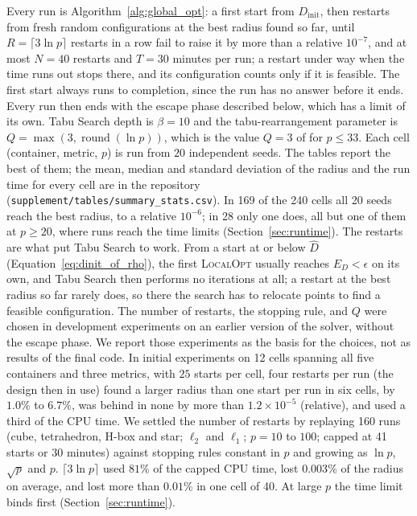 \documentclass[preprint,12pt]{elsarticle}
\theoremstyle{remark}
\begin{document}
Every run is Algorithm~\ref{alg:global_opt}: a first start from
$D_{\text{init}}$, then restarts from fresh random configurations at the best
radius found so far, until $R = \lceil 3 \ln p \rceil$ restarts in a row fail to
raise it by more than a relative $10^{-7}$, and at most $N = 40$ restarts and $T
= 30$ minutes per run; a restart under way when the time runs out stops there,
and its configuration counts only if it is feasible. The first start always runs
to completion, since the run has no answer before it ends. Every run then ends
with the escape phase described below, which has a limit of its own. Tabu Search
depth is $\beta = 10$ and the tabu-rearrangement parameter is $Q = \max(3,
\operatorname{round}(\ln p))$, which is the value $Q = 3$ of \citet{lai2024} for
$p \le 33$. Each cell (container, metric, $p$) is run from $20$ independent
seeds. The tables report the best of them; the mean, median and standard
deviation of the radius and the run time for every cell are in the repository
(\texttt{supplement/tables/summary\_stats.csv}). In 169 of the 240 cells all 20
seeds reach the best radius, to a relative $10^{-6}$; in 28 only one does, all
but one of them at $p \ge 20$, where runs reach the time limits
(Section~\ref{sec:runtime}). The restarts are what put Tabu Search to work. From
a start at or below $\hat D$ (Equation~\ref{eq:dinit_of_rho}), the first
\textsc{LocalOpt} usually reaches $E_D < \epsilon$ on its own, and Tabu Search
then performs no iterations at all; a restart at the best radius so far rarely
does, so there the search has to relocate points to find a feasible
configuration. The number of restarts, the stopping rule, and $Q$ were chosen in
development experiments on an earlier version of the solver, without the escape
phase. We report those experiments as the basis for the choices, not as results
of the final code. In initial experiments on 12 cells spanning all five
containers and three metrics, with $25$ starts per cell, four restarts per run
(the design then in use) found a larger radius than one start per run in six
cells, by $1.0\%$ to $6.7\%$, was behind in none by more than $1.2 \times
10^{-5}$ (relative), and used a third of the CPU time. We settled the number of
restarts by replaying 160 runs (cube, tetrahedron, H-box and star; $\ell_2$ and
$\ell_1$; $p = 10$ to $100$; capped at 41 starts or 30 minutes) against stopping
rules constant in $p$ and growing as $\ln p$, $\sqrt p$ and $p$. $\lceil 3 \ln p
\rceil$ used $81\%$ of the capped CPU time, lost $0.003\%$ of the radius on
average, and lost more than $0.01\%$ in one cell of 40. At large $p$ the time
limit binds first (Section~\ref{sec:runtime}).
\end{document}

